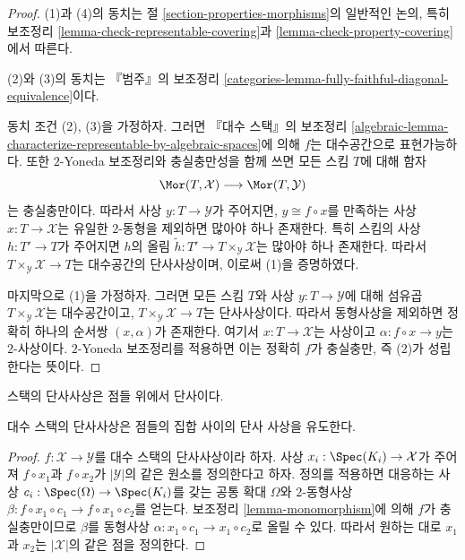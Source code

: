 \begin{proof}
(1)과 (4)의 동치는 절 \ref{section-properties-morphisms}의
일반적인 논의, 특히 보조정리
\ref{lemma-check-representable-covering}과
\ref{lemma-check-property-covering}에서 따른다.

\medskip\noindent
(2)와 (3)의 동치는 『범주』의 보조정리
\ref{categories-lemma-fully-faithful-diagonal-equivalence}이다.

\medskip\noindent
동치 조건 (2), (3)을 가정하자. 그러면 『대수 스택』의 보조정리
\ref{algebraic-lemma-characterize-representable-by-algebraic-spaces}에
의해 $f$는 대수공간으로 표현가능하다. 또한 $2$-Yoneda 보조정리와
충실충만성을 함께 쓰면 모든 스킴 $T$에 대해 함자
$$
\Mor(T, \mathcal{X})
\longrightarrow
\Mor(T, \mathcal{Y})
$$
는 충실충만이다. 따라서 사상 $y : T \to \mathcal{Y}$가 주어지면,
$y \cong f \circ x$를 만족하는 사상 $x : T \to \mathcal{X}$는
유일한 $2$-동형을 제외하면 많아야 하나 존재한다. 특히 스킴의 사상
$h : T' \to T$가 주어지면 $h$의 올림
$\tilde h : T' \to T \times_\mathcal{Y} \mathcal{X}$는 많아야 하나
존재한다. 따라서 $T \times_\mathcal{Y} \mathcal{X} \to T$는
대수공간의 단사사상이며, 이로써 (1)을 증명하였다.

\medskip\noindent
마지막으로 (1)을 가정하자. 그러면 모든 스킴 $T$와 사상
$y : T \to \mathcal{Y}$에 대해 섬유곱
$T \times_\mathcal{Y} \mathcal{X}$는 대수공간이고,
$T \times_\mathcal{Y} \mathcal{X} \to T$는 단사사상이다.
따라서 동형사상을 제외하면 정확히 하나의 순서쌍 $(x, \alpha)$가 존재한다.
여기서 $x : T \to \mathcal{X}$는 사상이고
$\alpha : f \circ x \to y$는 $2$-사상이다.
$2$-Yoneda 보조정리를 적용하면 이는 정확히 $f$가 충실충만,
즉 (2)가 성립한다는 뜻이다.
\end{proof}

\begin{lemma}
\label{lemma-monomorphism-injective-points}
\begin{slogan}
스택의 단사사상은 점들 위에서 단사이다.
\end{slogan}
대수 스택의 단사사상은 점들의 집합 사이의 단사 사상을 유도한다.
\end{lemma}

\begin{proof}
$f : \mathcal{X} \to \mathcal{Y}$를 대수 스택의 단사사상이라 하자.
사상 $x_i : \Spec(K_i) \to \mathcal{X}$가 주어져
$f \circ x_1$과 $f \circ x_2$가 $|\mathcal{Y}|$의 같은 원소를
정의한다고 하자. 정의를 적용하면 대응하는 사상
$c_i : \Spec(\Omega) \to \Spec(K_i)$를 갖는 공통 확대 $\Omega$와
$2$-동형사상 $\beta : f \circ x_1 \circ c_1 \to f \circ x_1 \circ c_2$를
얻는다. 보조정리 \ref{lemma-monomorphism}에 의해 $f$가 충실충만이므로
$\beta$를 동형사상
$\alpha : x_1 \circ c_1 \to x_1 \circ c_2$로 올릴 수 있다.
따라서 원하는 대로 $x_1$과 $x_2$는 $|\mathcal{X}|$의 같은 점을 정의한다.
\end{proof}

